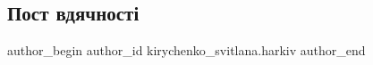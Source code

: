  
 
 
 
 
 
\subsection{Пост вдячності}
\label{sec:10_04_2022.fb.kirychenko_svitlana.harkiv.1.post_vdjachnosti}
 
\ifcmt
 author_begin
   author_id kirychenko_svitlana.harkiv
 author_end
\fi
